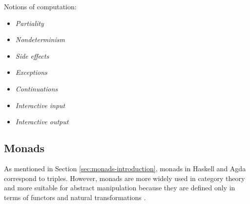 \begin{examples}
  \label{ex:notions-computation}


  Notions of computation:
  \begin{itemize}
  \item
    \emph{Partiality}
  \item
    \emph{Nondeterminism} 
  \item
    \emph{Side effects}
  \item
    \emph{Exceptions}
  \item
    \emph{Continuations}
  \item
    \emph{Interactive input}
  \item
    \emph{Interactive output}
  \end{itemize}
\end{examples}

\subsection*{Monads}


As mentioned in Section \ref{sec:monads-introduction}, monads in
Haskell and Agda correspond to triples. However, monads are more
widely used in category theory and more suitable for abstract
manipulation because they are defined only in terms of functors and
natural transformations \parencite[60]{moggi-1991}.


